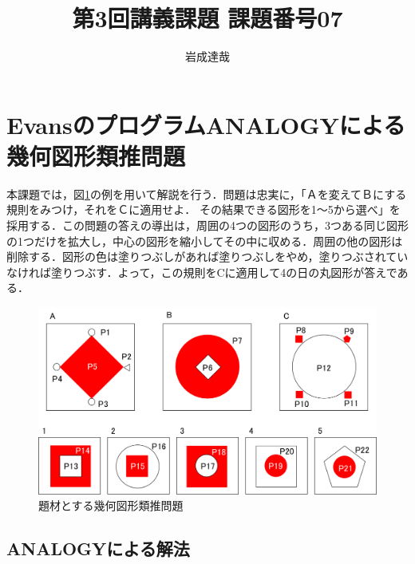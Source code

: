 \documentclass{jarticle}
\title{第3回講義課題 課題番号07}
\date{\todayd}
\author{岩成達哉}
\begin{document}
\begin{titlepage}
	\setlength{\topmargin}{1.1in}
	\vspace{100mm}
	\maketitle
\end{titlepage}


\section{EvansのプログラムANALOGYによる幾何図形類推問題}
本課題では，図\ref{fig:charts}の例を用いて解説を行う．問題は忠実に，「Ａを変えてＢにする規則をみつけ，それをＣに適用せよ． その結果できる図形を1〜5から選べ」を採用する．この問題の答えの導出は，周囲の4つの図形のうち，3つある同じ図形の1つだけを拡大し，中心の図形を縮小してその中に収める．周囲の他の図形は削除する．図形の色は塗りつぶしがあれば塗りつぶしをやめ，塗りつぶされていなければ塗りつぶす．よって，この規則をCに適用して4の日の丸図形が答えである．

\begin{figure}[H]
	\begin{center}
	\includegraphics[width=13cm]{image/charts.png}
	\caption{題材とする幾何図形類推問題}
	\label{fig:charts}
	\end{center}
\end{figure}





\subsection{ANALOGYによる解法}
\end{document}
